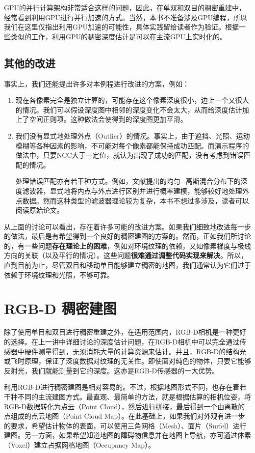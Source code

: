 GPU的并行计算架构非常适合这样的问题，因此，在单双和双目的稠密重建中，经常看到利用GPU进行并行加速的方式。当然，本书不准备涉及GPU编程，所以我们在这里仅指出利用GPU加速的可能性，具体实践留给读者作为验证。根据一些类似的工作，利用GPU的稠密深度估计是可以在主流GPU上实时化的。

\subsection{其他的改进}
事实上，我们还能提出许多对本例程进行改进的方案，例如：

\begin{enumerate}
	\item 现在各像素完全是独立计算的，可能存在这个像素深度很小，边上一个又很大的情况。我们可以假设深度图中相邻的深度变化不会太大，从而给深度估计加上了空间正则项。这种做法会使得到的深度图更加平滑。
	\item 我们没有显式地处理外点（Outlier）的情况。事实上，由于遮挡、光照、运动模糊等各种因素的影响，不可能对每个像素都能保持成功匹配。而演示程序的做法中，只要NCC大于一定值，就认为出现了成功的匹配，没有考虑到错误匹配的情况。
	
	\hspace{2em}处理错误匹配亦有若干种方式。例如，文献\cite{Vogiatzis2011}提出的均匀−高斯混合分布下的深度滤波器，显式地将内点与外点进行区别并进行概率建模，能够较好地处理外点数据。然而这种类型的滤波器理论较为复杂，本书不想过多涉及，读者可以阅读原始论文。
\end{enumerate}

从上面的讨论可以看出，存在着许多可能的改进方案。如果我们细致地改进每一步的做法，最后是有希望得到一个良好的稠密建图的方案的。然而，正如我们所讨论的，有一些问题\textbf{存在理论上的困难}，例如对环境纹理的依赖，又如像素梯度与极线方向的关联（以及平行的情况）。这些问题\textbf{很难通过调整代码实现来解决}。所以，直到目前为止，尽管双目和移动单目能够建立稠密的地图，我们通常认为它们过于依赖于环境纹理和光照，不够可靠。

\section{RGB-D 稠密建图}
除了使用单目和双目进行稠密重建之外，在适用范围内，RGB-D相机是一种更好的选择。在上一讲中详细讨论的深度估计问题，在RGB-D相机中可以完全通过传感器中硬件测量得到，无须消耗大量的计算资源来估计。并且，RGB-D的结构光或飞时原理，保证了深度数据对纹理的无关性。即使面对纯色的物体，只要它能够反射光，我们就能测量到它的深度。这亦是RGB-D传感器的一大优势。

利用RGB-D进行稠密建图是相对容易的。不过，根据地图形式不同，也存在着若干种不同的主流建图方式。最直观、最简单的方法，就是根据估算的相机位姿，将RGB-D数据转化为点云（Point Cloud），然后进行拼接，最后得到一个由离散的点组成的点云地图（Point Cloud Map）。在此基础上，如果我们对外观有进一步的要求，希望估计物体的表面，可以使用三角网格（Mesh）、面片（Surfel）进行建图。另一方面，如果希望知道地图的障碍物信息并在地图上导航，亦可通过体素（Voxel）建立占据网格地图（Occupancy Map）。

